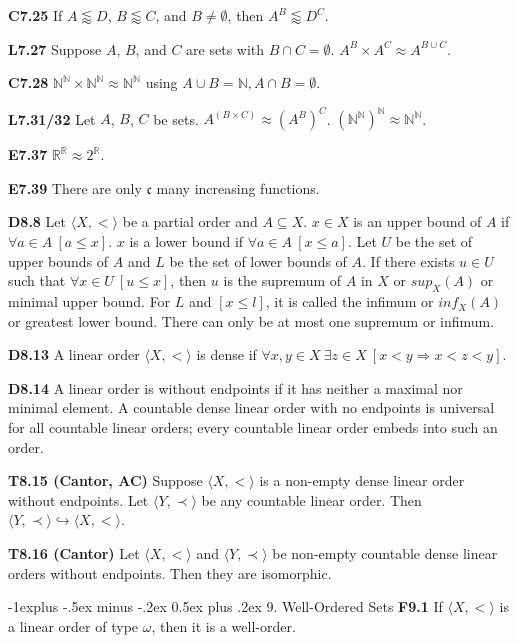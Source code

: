 \documentclass[10pt, landscape]{article}
\makeatletter
\renewcommand{\section}{\@startsection{section}{1}{0mm}%
                                {-1ex plus -.5ex minus -.2ex}%
                                {0.5ex plus .2ex}%
                                {\normalfont\large\bfseries}}
\renewcommand{\section}{\@startsection{section}{2}{0mm}%
                                {-1explus -.5ex minus -.2ex}%
                                {0.5ex plus .2ex}%
                                {\normalfont\normalsize\bfseries}}
\makeatother
\begin{document}
\begin{multicols*}{3}
\textbf{C7.25} If $A \lessapprox D$, $B \lessapprox C$, and $B \neq \emptyset$, then $A^B \lessapprox D^C$.

\textbf{L7.27} Suppose $A$, $B$, and $C$ are sets with $B \cap C = \emptyset$. $A^B \times A^C \approx A^{B \cup C}$.

\textbf{C7.28} $\mathbb{N}^\mathbb{N} \times \mathbb{N}^\mathbb{N} \approx \mathbb{N}^\mathbb{N}$ using $A \cup B = \mathbb{N}, A \cap B = \emptyset$.

\textbf{L7.31/32} Let $A$, $B$, $C$ be sets. $A^{(B \times C)}\approx (A^B)^C$. $(\mathbb{N}^\mathbb{N})^\mathbb{N}\approx \mathbb{N}^\mathbb{N}$.

\textbf{E7.37} $\mathbb{R}^\mathbb{R}\approx 2^\mathbb{R}$.

\textbf{E7.39} There are only $\mathfrak{c}$ many increasing functions.

\textbf{D8.8} Let $\langle X, < \rangle$ be a partial order and $A \subseteq X$. $x \in X$ is an upper bound of $A$ if $\forall a \in A \ [a \leq x]$. $x$ is a lower bound if $\forall a \in A \ [x \leq a]$. Let $U$ be the set of upper bounds of $A$ and $L$ be the set of lower bounds of $A$. If there exists $u \in U$ such that $\forall x \in U \ [u \leq x]$, then $u$ is the supremum of $A$ in $X$ or $sup_X(A)$ or minimal upper bound. For $L$ and $[x \leq l]$, it is called the infimum or $inf_X(A)$ or greatest lower bound. There can only be at most one supremum or infimum.

\textbf{D8.13} A linear order $\langle X, < \rangle$ is dense if $\forall x, y \in X \ \exists z \in X \ [x < y \Rightarrow x < z < y]$.

\textbf{D8.14} A linear order is without endpoints if it has neither a maximal nor minimal element. A countable dense linear order with no endpoints is universal for all countable linear orders; every countable linear order embeds into such an order.

\textbf{T8.15 (Cantor, AC)} Suppose $\langle X, < \rangle$ is a non-empty dense linear order without endpoints. Let $\langle Y, \prec \rangle$ be any countable linear order. Then $\langle Y, \prec \rangle \hookrightarrow \langle X, < \rangle$.

\textbf{T8.16 (Cantor)} Let $\langle X, < \rangle$ and $\langle Y, \prec \rangle$ be non-empty countable dense linear orders without endpoints. Then they are isomorphic.

\section{9. Well-Ordered Sets}
\textbf{F9.1} If $\langle X, < \rangle$ is a linear order of type $\omega$, then it is a well-order.


\end{multicols*}
\end{document}
